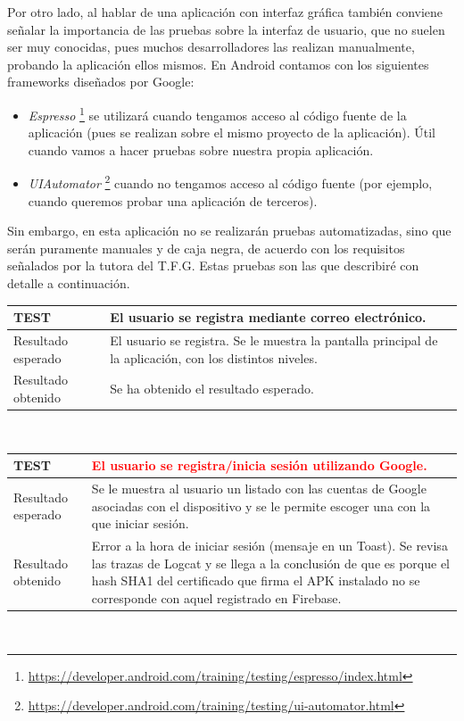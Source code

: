 \documentclass[twoside]{report}
\newcommand\addrow[2]{#1 &#2\\ }
\newcommand\addheading[2]{#1 &#2\\ \hline}
\newcommand\tabularhead{\begin{tabular}{lp{0.7\textwidth}}
\hline
}
\newenvironment{test}{\tabularhead}
{\hline\end{tabular}}
\begin{document}
Por otro lado, al hablar de una aplicación con interfaz gráfica también conviene señalar la importancia de las pruebas sobre la interfaz de usuario, que no suelen ser muy conocidas, pues muchos desarrolladores las realizan manualmente, probando la aplicación ellos mismos. En Android contamos con los siguientes frameworks diseñados por Google:

\begin{itemize}
\item \textit{Espresso} \footnote{\url{https://developer.android.com/training/testing/espresso/index.html}} se utilizará cuando tengamos acceso al código fuente de la aplicación (pues se realizan sobre el mismo proyecto de la aplicación). Útil cuando vamos a hacer pruebas sobre nuestra propia aplicación.

\item \textit{UIAutomator} \footnote{\url{https://developer.android.com/training/testing/ui-automator.html}} cuando no tengamos acceso al código fuente (por ejemplo, cuando queremos probar una aplicación de terceros).

\end{itemize}


Sin embargo, en esta aplicación no se realizarán pruebas automatizadas, sino que serán puramente manuales y de caja negra, de acuerdo con los requisitos señalados por la tutora del T.F.G. Estas pruebas son las que describiré con detalle a continuación.

\vspace{1cm}

\begin{test}
  \addheading{\textbf{TEST\arabic{test}}}{El usuario se registra mediante correo electrónico.} 
  \addrow{Resultado esperado}{El usuario se registra. Se le muestra la pantalla principal de la aplicación, con los distintos niveles.}
  \addrow{Resultado obtenido}{Se ha obtenido el resultado esperado.}
\end{test}\\

\vspace{0.5cm}

\begin{test}
  \addheading{\textbf{TEST\arabic{test}}}{\textcolor{red}{El usuario se registra/inicia sesión utilizando Google.}} 
  \addrow{Resultado esperado}{Se le muestra al usuario un listado con las cuentas de Google asociadas con el dispositivo y se le permite escoger una con la que iniciar sesión.}
  \addrow{Resultado obtenido}{Error a la hora de iniciar sesión (mensaje en un Toast). Se revisa las trazas de Logcat y se llega a la conclusión de que es porque el hash SHA1 del certificado que firma el APK instalado no se corresponde con aquel registrado en Firebase.}
\end{test}\\
\end{document}
